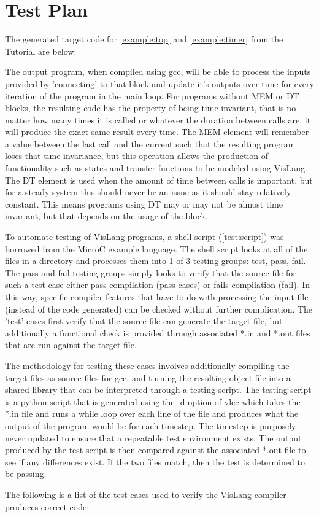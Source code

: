 \section{Test Plan}

The generated target code for \autoref{example:top} and \autoref{example:timer}
from the Tutorial are below:


The output program, when compiled using gcc, will be able to process the inputs provided
by 'connecting' to that block and update it's outputs over time for every iteration of
the program in the main loop. For programs without MEM or DT blocks, the resulting code
has the property of being time-invariant, that is no matter how many times it is called
or whatever the duration between calls are, it will produce the exact same result every
time. The MEM element will remember a value between the last call and the current such
that the resulting program loses that time invariance, but this operation allows the
production of functionality such as states and transfer functions to be modeled using
VisLang. The DT element is used when the amount of time between calls is important,
but for a steady system this should never be an issue as it should stay relatively
constant. This means programs using DT may or may not be almost time invariant, but
that depends on the usage of the block.
\par
To automate testing of VisLang programs, a shell script (\autoref{test:script}) was
borrowed from the MicroC example language. The shell script looks at all of the files
in a directory and processes them into 1 of 3 testing groups: test, pass, fail. The pass
and fail testing groups simply looks to verify that the source file for such a test case
either pass compilation (pass cases) or fails compilation (fail). In this way, specific
compiler features that have to do with processing the input file (instead of the code
generated) can be checked without further complication. The 'test' cases first verify that
the source file can generate the target file, but additionally a functional check is
provided through associated *.in and *.out files that are run against the target file.
\par
The methodology for testing these cases involves additionally compiling the target files
as source files for gcc, and turning the resulting object file into a shared library that
can be interpreted through a testing script. The testing script is a python script that
is generated using the -d option of vlcc which takes the *.in file and runs a while loop
over each line of the file and produces what the output of the program would be for each
timestep. The timestep is purposely never updated to ensure that a repeatable test
environment exists. The output produced by the test script is then compared against the
associated *.out file to see if any differences exist. If the two files match, then the
test is determined to be passing.
\par
The following is a list of the test cases used to verify the VisLang compiler produces
correct code:

